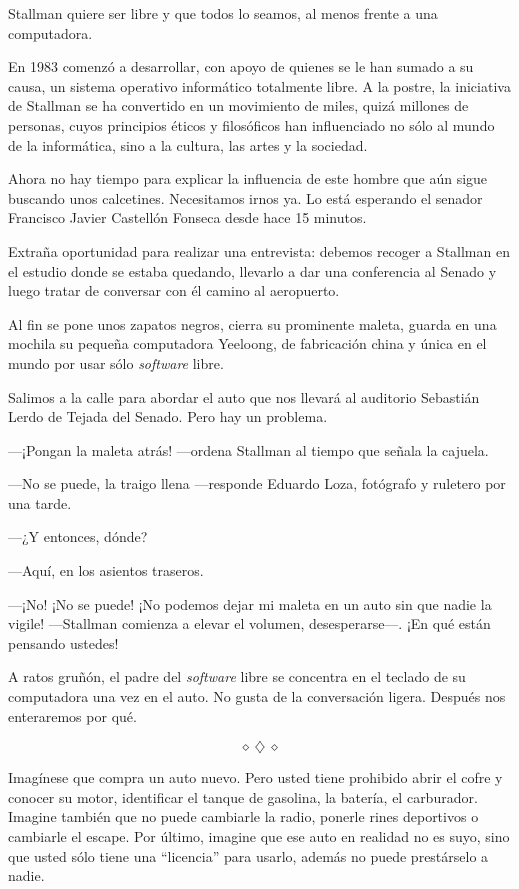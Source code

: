 \documentclass[oneside,twocolumn]{article}
\begin{document}
Stallman quiere ser libre y que todos lo seamos, al menos frente a una computadora.

En 1983 comenzó a desarrollar, con apoyo de quienes se le han sumado a su causa, un sistema operativo informático
totalmente libre. A la postre, la iniciativa de Stallman se ha convertido en un movimiento de miles, quizá millones 
de personas, cuyos principios éticos y filosóficos han influenciado no sólo al mundo de la informática, sino a 
la cultura, las artes y la sociedad.

Ahora no hay tiempo para explicar la influencia de este hombre que aún sigue buscando unos calcetines. 
Necesitamos irnos ya. Lo está esperando el senador Francisco Javier Castellón Fonseca desde hace 15 minutos.

Extraña oportunidad para realizar una entrevista: debemos recoger a Stallman en el estudio donde se estaba
quedando, llevarlo a dar una conferencia al Senado y luego tratar de conversar con él camino al aeropuerto.

Al fin se pone unos zapatos negros, cierra su prominente maleta, guarda en una mochila su pequeña computadora
Yeeloong, de fabricación china y única en el mundo por usar sólo \emph{software} libre.

Salimos a la calle para abordar el auto que nos llevará al auditorio Sebastián Lerdo de Tejada del Senado. 
Pero hay un problema.

---¡Pongan la maleta atrás! ---ordena Stallman al tiempo que señala la cajuela.

---No se puede, la traigo llena ---responde Eduardo Loza, fotógrafo y ruletero por una tarde.

---¿Y entonces, dónde?

---Aquí, en los asientos traseros.

---¡No! ¡No se puede! ¡No podemos dejar mi maleta en un auto sin que nadie la vigile! ---Stallman comienza a elevar
el volumen, desesperarse---. ¡En qué están pensando ustedes!

A ratos gruñón, el padre del \emph{software} libre se concentra en el teclado de su computadora una vez en el 
auto. No gusta de la conversación ligera. Después nos enteraremos por qué.

\[\diamond~\diamondsuit~\diamond\]

Imagínese que compra un auto nuevo. Pero usted tiene prohibido abrir el cofre y conocer su motor, 
identificar el tanque de gasolina, la batería, el carburador. Imagine también que no puede cambiarle la radio, 
ponerle rines deportivos o cambiarle el escape. Por último, imagine que ese auto en realidad no es suyo, sino 
que usted sólo tiene una ``licencia'' para usarlo, además no puede prestárselo a nadie.
\end{document}
